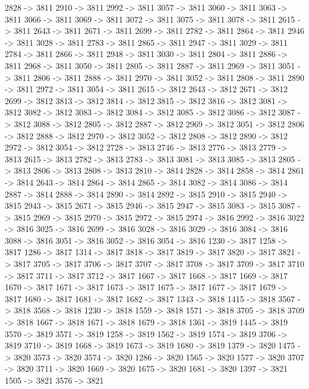 {	2828 -> 3811
	2910 -> 3811
	2992 -> 3811
	3057 -> 3811
	3060 -> 3811
	3063 -> 3811
	3066 -> 3811
	3069 -> 3811
	3072 -> 3811
	3075 -> 3811
	3078 -> 3811
	2615 -> 3811
	2643 -> 3811
	2671 -> 3811
	2699 -> 3811
	2782 -> 3811
	2864 -> 3811
	2946 -> 3811
	3028 -> 3811
	2783 -> 3811
	2865 -> 3811
	2947 -> 3811
	3029 -> 3811
	2784 -> 3811
	2866 -> 3811
	2948 -> 3811
	3030 -> 3811
	2804 -> 3811
	2886 -> 3811
	2968 -> 3811
	3050 -> 3811
	2805 -> 3811
	2887 -> 3811
	2969 -> 3811
	3051 -> 3811
	2806 -> 3811
	2888 -> 3811
	2970 -> 3811
	3052 -> 3811
	2808 -> 3811
	2890 -> 3811
	2972 -> 3811
	3054 -> 3811
	2615 -> 3812
	2643 -> 3812
	2671 -> 3812
	2699 -> 3812
	3813 -> 3812
	3814 -> 3812
	3815 -> 3812
	3816 -> 3812
	3081 -> 3812
	3082 -> 3812
	3083 -> 3812
	3084 -> 3812
	3085 -> 3812
	3086 -> 3812
	3087 -> 3812
	3088 -> 3812
	2805 -> 3812
	2887 -> 3812
	2969 -> 3812
	3051 -> 3812
	2806 -> 3812
	2888 -> 3812
	2970 -> 3812
	3052 -> 3812
	2808 -> 3812
	2890 -> 3812
	2972 -> 3812
	3054 -> 3812
	2728 -> 3813
	2746 -> 3813
	2776 -> 3813
	2779 -> 3813
	2615 -> 3813
	2782 -> 3813
	2783 -> 3813
	3081 -> 3813
	3085 -> 3813
	2805 -> 3813
	2806 -> 3813
	2808 -> 3813
	2810 -> 3814
	2828 -> 3814
	2858 -> 3814
	2861 -> 3814
	2643 -> 3814
	2864 -> 3814
	2865 -> 3814
	3082 -> 3814
	3086 -> 3814
	2887 -> 3814
	2888 -> 3814
	2890 -> 3814
	2892 -> 3815
	2910 -> 3815
	2940 -> 3815
	2943 -> 3815
	2671 -> 3815
	2946 -> 3815
	2947 -> 3815
	3083 -> 3815
	3087 -> 3815
	2969 -> 3815
	2970 -> 3815
	2972 -> 3815
	2974 -> 3816
	2992 -> 3816
	3022 -> 3816
	3025 -> 3816
	2699 -> 3816
	3028 -> 3816
	3029 -> 3816
	3084 -> 3816
	3088 -> 3816
	3051 -> 3816
	3052 -> 3816
	3054 -> 3816
	1230 -> 3817
	1258 -> 3817
	1286 -> 3817
	1314 -> 3817
	3818 -> 3817
	3819 -> 3817
	3820 -> 3817
	3821 -> 3817
	3705 -> 3817
	3706 -> 3817
	3707 -> 3817
	3708 -> 3817
	3709 -> 3817
	3710 -> 3817
	3711 -> 3817
	3712 -> 3817
	1667 -> 3817
	1668 -> 3817
	1669 -> 3817
	1670 -> 3817
	1671 -> 3817
	1673 -> 3817
	1675 -> 3817
	1677 -> 3817
	1679 -> 3817
	1680 -> 3817
	1681 -> 3817
	1682 -> 3817
	1343 -> 3818
	1415 -> 3818
	3567 -> 3818
	3568 -> 3818
	1230 -> 3818
	1559 -> 3818
	1571 -> 3818
	3705 -> 3818
	3709 -> 3818
	1667 -> 3818
	1671 -> 3818
	1679 -> 3818
	1361 -> 3819
	1445 -> 3819
	3570 -> 3819
	3571 -> 3819
	1258 -> 3819
	1562 -> 3819
	1574 -> 3819
	3706 -> 3819
	3710 -> 3819
	1668 -> 3819
	1673 -> 3819
	1680 -> 3819
	1379 -> 3820
	1475 -> 3820
	3573 -> 3820
	3574 -> 3820
	1286 -> 3820
	1565 -> 3820
	1577 -> 3820
	3707 -> 3820
	3711 -> 3820
	1669 -> 3820
	1675 -> 3820
	1681 -> 3820
	1397 -> 3821
	1505 -> 3821
	3576 -> 3821
}
